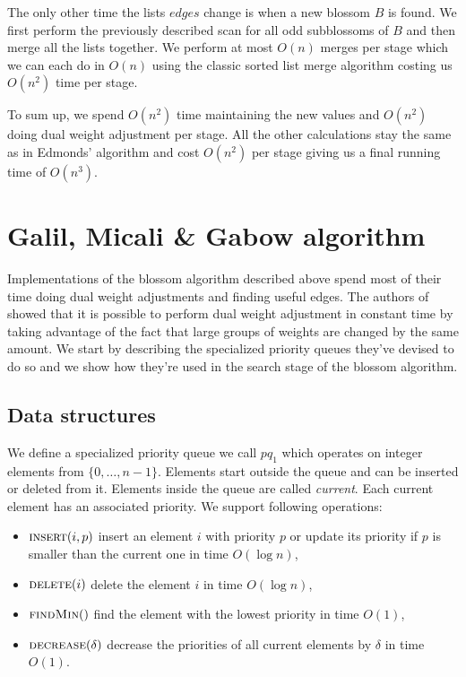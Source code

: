 The only other time the lists $edges$ change is when a new blossom $B$ is found. We first perform the previously described scan for all odd subblossoms of $B$ and then merge all the lists together. We perform at most $O(n)$ merges per stage which we can each do in $O(n)$ using the classic sorted list merge algorithm costing us $O(n^2)$ time per stage.

To sum up, we spend $O(n^2)$ time maintaining the new values and $O(n^2)$ doing dual weight adjustment per stage. All the other calculations stay the same as in Edmonds' algorithm and cost $O(n^2)$ per stage giving us a final running time of $O(n^3)$.

\section{Galil, Micali \& Gabow algorithm}

Implementations of the blossom algorithm described above spend most of their time doing dual weight adjustments and finding useful edges. The authors of~\cite{micali1980v} showed that it is possible to perform dual weight adjustment in constant time by taking advantage of the fact that large groups of weights are changed by the same amount. We start by describing the specialized priority queues they've devised to do so and we show how they're used in the search stage of the blossom algorithm.

\subsection{Data structures}

We define a specialized priority queue we call $pq_1$ which operates on integer elements from $\{0, \dots, n-1\}$. Elements start outside the queue and can be inserted or deleted from it. Elements inside the queue are called \textit{current}. Each current element has an associated priority. We support following operations:

\begin{itemize}
    \item $\textsc{insert}(i, p)$ insert an element $i$ with priority $p$ or update its priority if $p$ is smaller than the current one in time $O(\log n)$,
    \item $\textsc{delete}(i)$ delete the element $i$ in time $O(\log n)$,
    \item $\textsc{findMin}()$ find the element with the lowest priority in time $O(1)$,
    \item $\textsc{decrease}(\delta)$ decrease the priorities of all current elements by $\delta$ in time $O(1)$.
\end{itemize}

